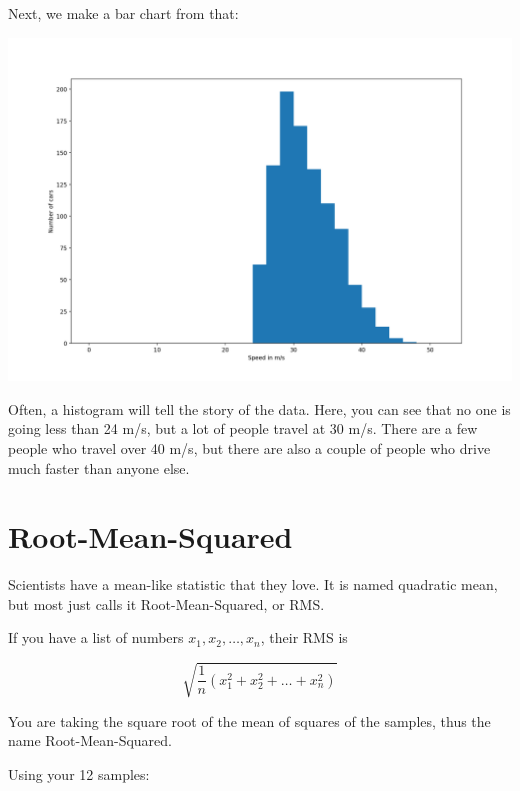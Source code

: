 Next, we make a bar chart from that:

\includegraphics[width=\textwidth] {speed_histo.png}

Often, a histogram will tell the story of the data. Here, you can see
that no one is going less than 24 m/s, but a lot of people travel at
30 m/s. There are a few people who travel over 40 m/s, but there are also a
couple of people who drive much faster than anyone else.

\section{Root-Mean-Squared}

Scientists have a mean-like statistic that they love. It is named
quadratic mean, but most just calls it Root-Mean-Squared, or
RMS.

\begin{mdframed}[style=important, frametitle={Definition of RMS}]

If you have a list of numbers $x_1, x_2, \ldots, x_n$, their RMS
is   

$$\sqrt{\frac{1}{n}\left( x_1^2 + x_2^2 + \ldots + x_n^2 \right)}$$

\end{mdframed}

You are taking the square root of the mean of squares of the samples,
thus the name Root-Mean-Squared.

Using your 12 samples:

